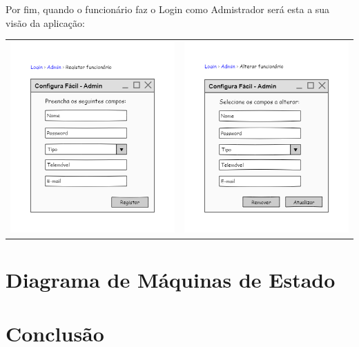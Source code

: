 \documentclass[11pt]{article} %
\begin{document}
Por fim, quando o funcionário faz o Login como Admistrador será esta a sua visão da aplicação:
\begin{center}
	\begin{table}[!htbp]
		\begin{tabular}{cc}
 			\includegraphics[width = 3in]{registar_funcionrio.png} & \includegraphics[width = 3in]{alterar_funcionrio.png}
		\end{tabular}
	\end{table}

\end{center}


\section{Diagrama de Máquinas de Estado}

\section{Conclusão}
\end{document}
